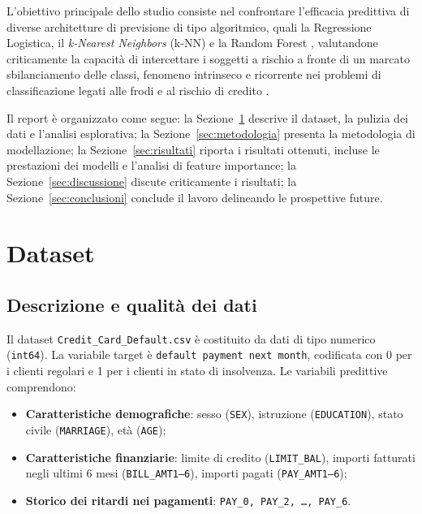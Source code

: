 \documentclass[11pt,a4paper]{article}
\begin{document}
L'obiettivo principale dello studio consiste nel confrontare l'efficacia predittiva di diverse architetture di previsione di tipo algoritmico, quali la Regressione Logistica, il \emph{k-Nearest Neighbors} (k-NN) e la Random Forest \cite{breiman2001}, valutandone criticamente la capacità di intercettare i soggetti a rischio a fronte di un marcato sbilanciamento delle classi, fenomeno intrinseco e ricorrente nei problemi di classificazione legati alle frodi e al rischio di credito \cite{fawcett2006}.

Il report è organizzato come segue: la Sezione~\ref{sec:dataset} descrive il dataset, la pulizia dei dati e l'analisi esplorativa; la Sezione~\ref{sec:metodologia} presenta la metodologia di modellazione; la Sezione~\ref{sec:risultati} riporta i risultati ottenuti, incluse le prestazioni dei modelli e l'analisi di feature importance; la Sezione~\ref{sec:discussione} discute criticamente i risultati; la Sezione~\ref{sec:conclusioni} conclude il lavoro delineando le prospettive future.

\newpage
\section{Dataset}
\label{sec:dataset}

\subsection{Descrizione e qualità dei dati}

Il dataset \texttt{Credit\_Card\_Default.csv} è costituito da dati di tipo numerico (\texttt{int64}). La variabile target è \texttt{default payment next month}, codificata con 0 per i clienti regolari e 1 per i clienti in stato di insolvenza. Le variabili predittive comprendono:

\begin{itemize}
    \item \textbf{Caratteristiche demografiche}: sesso (\texttt{SEX}), istruzione (\texttt{EDUCATION}), stato civile (\texttt{MARRIAGE}), età (\texttt{AGE});
    \item \textbf{Caratteristiche finanziarie}: limite di credito (\texttt{LIMIT\_BAL}), importi fatturati negli ultimi 6 mesi (\texttt{BILL\_AMT1--6}), importi pagati (\texttt{PAY\_AMT1--6});
    \item \textbf{Storico dei ritardi nei pagamenti}: \texttt{PAY\_0, PAY\_2, \dots, PAY\_6}.
\end{itemize}
\end{document}
